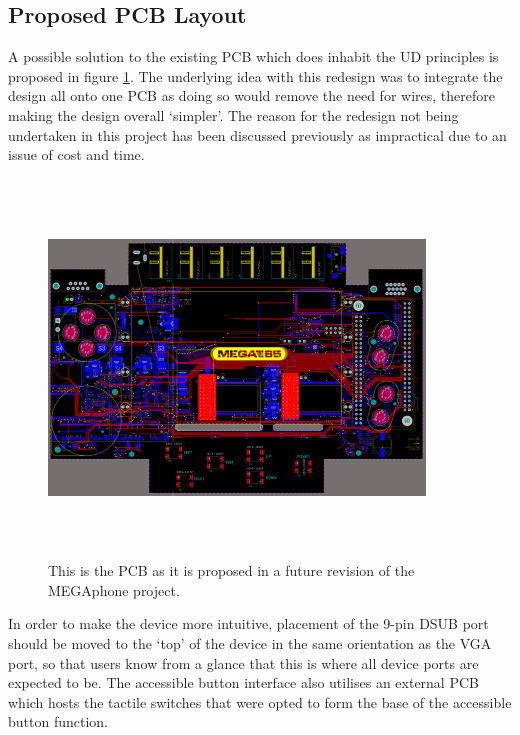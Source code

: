 \subsection{Proposed PCB Layout} \label{Proposed}

A possible solution to the existing PCB which does inhabit the UD principles is proposed in figure \ref{fig:FuturePCB}. 
The underlying idea with this redesign was to integrate the design all onto one PCB as doing so would remove the need for wires, therefore making the design overall ‘simpler’.
The reason for the redesign not being undertaken in this project has been discussed previously as impractical due to an issue of cost and time.

\begin{figure} [h]
\begin{centering}
\includegraphics[width=10cm,height=10cm,keepaspectratio]{Figures/pcb_final.png}
\caption{This is the PCB as it is proposed in a future revision of the MEGAphone project.}
\label{fig:FuturePCB}
\end{centering}
\end{figure}

In order to make the device more intuitive, placement of the 9-pin DSUB port should be moved to the ‘top’ of the device in the same orientation as the VGA port, so that users know from a glance that this is where all device ports are expected to be.
The accessible button interface also utilises an external PCB which hosts the tactile switches that were opted to form the base of the accessible button function.


